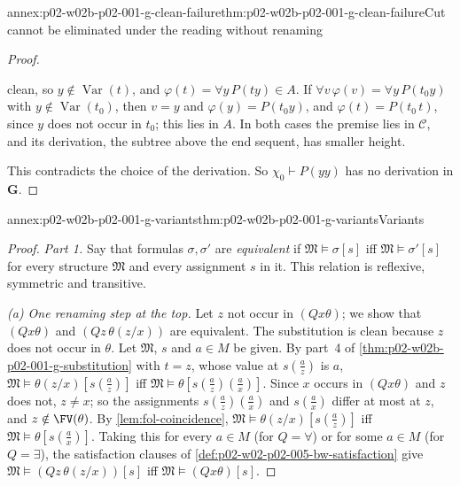 \begin{annexitem}{annex:p02-w02b-p02-001-g-clean-failure}{thm:p02-w02b-p02-001-g-clean-failure}{Cut cannot be eliminated under the reading without renaming}
\begin{proof}
\begin{enumerate}
      clean, so \(y\notin\operatorname{Var}(t)\), and
      \(\varphi(t)=\forall y\,P(ty)\in A\).  If
      \(\forall v\,\varphi(v)=\forall y\,P(t_0y)\) with
      \(y\notin\operatorname{Var}(t_0)\), then \(v=y\) and
      \(\varphi(y)=P(t_0y)\), and \(\varphi(t)=P(t_0\,t)\), since \(y\) does
      not occur in \(t_0\); this lies in \(A\).  In both cases the premise
      lies in \(\mathcal C\), and its derivation, the subtree above the end
      sequent, has smaller height.
\end{enumerate}
This contradicts the choice of the derivation.  So
\(\chi_0\vdash P(yy)\) has no derivation in \(\mathbf G\).
\end{proof}
\end{annexitem}

\begin{annexitem}{annex:p02-w02b-p02-001-g-variants}{thm:p02-w02b-p02-001-g-variants}{Variants}
\begin{proof}
\emph{Part 1.}  Say that formulas \(\sigma,\sigma'\) are
\emph{equivalent} if \(\mathfrak M\models\sigma[s]\) iff
\(\mathfrak M\models\sigma'[s]\) for every structure \(\mathfrak M\) and
every assignment \(s\) in it.  This relation is reflexive, symmetric and
transitive.

\emph{(a) One renaming step at the top.}  Let \(z\) not occur in
\((Qx\theta)\); we show that \((Qx\theta)\) and \((Qz\,\theta(z/x))\) are
equivalent.  The substitution is clean because \(z\) does not occur in
\(\theta\).  Let \(\mathfrak M\), \(s\) and \(a\in M\) be given.  By
part~4 of \cref{thm:p02-w02b-p02-001-g-substitution} with \(t=z\), whose
value at \(s(\tfrac az)\) is \(a\),
\(\mathfrak M\models\theta(z/x)[s(\tfrac az)]\) iff
\(\mathfrak M\models\theta[s(\tfrac az)(\tfrac ax)]\).  Since \(x\) occurs
in \((Qx\theta)\) and \(z\) does not, \(z\neq x\); so the assignments
\(s(\tfrac az)(\tfrac ax)\) and \(s(\tfrac ax)\) differ at most at \(z\),
and \(z\notin\FV(\theta)\).  By \cref{lem:fol-coincidence},
\(\mathfrak M\models\theta(z/x)[s(\tfrac az)]\) iff
\(\mathfrak M\models\theta[s(\tfrac ax)]\).  Taking this for every
\(a\in M\) (for \(Q=\forall\)) or for some \(a\in M\) (for \(Q=\exists\)),
the satisfaction clauses of \cref{def:p02-w02-p02-005-bw-satisfaction}
give \(\mathfrak M\models(Qz\,\theta(z/x))[s]\) iff
\(\mathfrak M\models(Qx\theta)[s]\).


\end{proof}
\end{annexitem}
